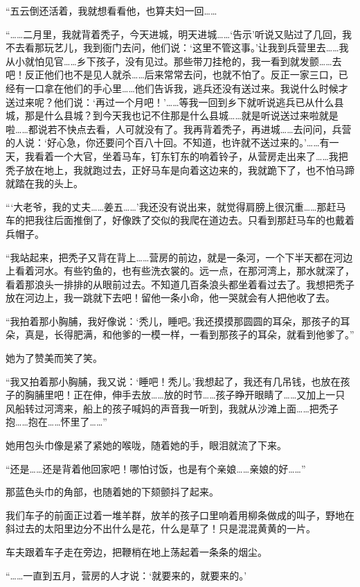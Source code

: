\par “五云倒还活着，我就想看看他，也算夫妇一回……
\par “……二月里，我就背着秃子，今天进城，明天进城……‘告示’听说又贴过了几回，我不去看那玩艺儿，我到衙门去问，他们说：‘这里不管这事。’让我到兵营里去……我从小就怕见官……乡下孩子，没有见过。那些带刀挂枪的，我一看到就发颤……去吧！反正他们也不是见人就杀……后来常常去问，也就不怕了。反正一家三口，已经有一口拿在他们的手心里……他们告诉我，逃兵还没有送过来。我说什么时候才送过来呢？他们说：‘再过一个月吧！'……等我一回到乡下就听说逃兵已从什么县城，那是什么县城？到今天我也记不住那是什么县城……就是听说送过来啦就是啦……都说若不快点去看，人可就没有了。我再背着秃子，再进城……去问问，兵营的人说：‘好心急，你还要问个百八十回。不知道，也许就不送过来的。'……有一天，我看着一个大官，坐着马车，钉东钉东的响着铃子，从营房走出来了……我把秃子放在地上，我就跑过去，正好马车是向着这边来的，我就跪下了，也不怕马蹄就踏在我的头上。
\par “‘大老爷，我的丈夫……姜五……’我还没有说出来，就觉得肩膀上很沉重……那赶马车的把我往后面推倒了，好像跌了交似的我爬在道边去。只看到那赶马车的也戴着兵帽子。
\par “我站起来，把秃子又背在背上……营房的前边，就是一条河，一个下半天都在河边上看着河水。有些钓鱼的，也有些洗衣裳的。远一点，在那河湾上，那水就深了，看着那浪头一排排的从眼前过去。不知道几百条浪头都坐着看过去了。我想把秃子放在河边上，我一跳就下去吧！留他一条小命，他一哭就会有人把他收了去。
\par “我拍着那小胸脯，我好像说：‘秃儿，睡吧。’我还摸摸那圆圆的耳朵，那孩子的耳朵，真是，长得肥满，和他爹的一模一样，一看到那孩子的耳朵，就看到他爹了。”
\par 她为了赞美而笑了笑。
\par “我又拍着那小胸脯，我又说：‘睡吧！秃儿。’我想起了，我还有几吊钱，也放在孩子的胸脯里吧！正在伸，伸手去放……放的时节……孩子睁开眼睛了……又加上一只风船转过河湾来，船上的孩子喊妈的声音我一听到，我就从沙滩上面……把秃子抱……抱在……怀里了……”
\par 她用包头巾像是紧了紧她的喉咙，随着她的手，眼泪就流了下来。
\par “还是……还是背着他回家吧！哪怕讨饭，也是有个亲娘……亲娘的好……”
\par 那蓝色头巾的角部，也随着她的下颏颤抖了起来。
\par 我们车子的前面正过着一堆羊群，放羊的孩子口里响着用柳条做成的叫子，野地在斜过去的太阳里边分不出什么是花，什么是草了！只是混混黄黄的一片。
\par 车夫跟着车子走在旁边，把鞭梢在地上荡起着一条条的烟尘。
\par “……一直到五月，营房的人才说：‘就要来的，就要来的。’

